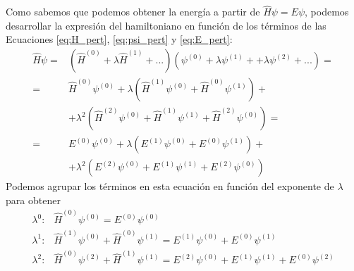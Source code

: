 Como sabemos que podemos obtener la energía
a partir de $\hat{H}\psi = E\psi$, podemos desarrollar la 
expresión del hamiltoniano en función de los términos de las Ecuaciones
\ref{eq:H_pert}, \ref{eq:psi_pert} y \ref{eq:E_pert}:
\begin{equation}
\begin{split}
    \hat{H}\psi =& (\hat{H}^{(0)} + \lambda \hat{H}^{(1)} + ...)(\psi^{(0)} + \lambda\psi^{(1)} +  + \lambda\psi^{(2)} + ...) = \\
    =& \hat{H}^{(0)}\psi^{(0)} + 
    \lambda (\hat{H}^{(1)}\psi^{(0)} + \hat{H}^{(0)}\psi^{(1)}) + \\ 
    &+ \lambda^2 (\hat{H}^{(2)}\psi^{(0)} + \hat{H}^{(1)}\psi^{(1)} + \hat{H}^{(2)}\psi^{(0)} ) =  \\
    =& E^{(0)}\psi^{(0)} + \lambda (E^{(1)}\psi^{(0)} + E^{(0)}\psi^{(1)}) + \\
    &+ \lambda^2 (E^{(2)}\psi^{(0)} + E^{(1)}\psi^{(1)} + E^{(2)}\psi^{(0)})
\end{split}
\end{equation}
Podemos agrupar los términos en esta ecuación en función del
exponente de $\lambda$ para obtener
\begin{align}
    \lambda^0\mathrm{:} & \hat{H}^{(0)}\psi^{(0)}= E^{(0)}\psi^{(0)}\label{eq:HE_pert0}\\
    \lambda^1\mathrm{:}&
    \hat{H}^{(1)}\psi^{(0)} + \hat{H}^{(0)}\psi^{(1)} = E^{(1)}\psi^{(0)} + E^{(0)}\psi^{(1)} \label{eq:HE_pert1}\\
    \lambda^2\mathrm{:}  &     
     \hat{H}^{(0)}\psi^{(2)} + \hat{H}^{(1)}\psi^{(1)} = E^{(2)}\psi^{(0)} + E^{(1)}\psi^{(1)}+ E^{(0)}\psi^{(2)}
\end{align}

